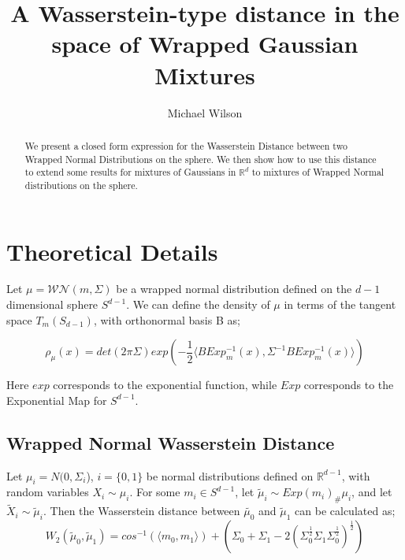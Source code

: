 \documentclass[]{article}
\title{A Wasserstein-type distance in the space of Wrapped Gaussian Mixtures}
\author{Michael Wilson}
\date{}
\begin{document}
	
	\maketitle
	
	\begin{abstract}
	We present a closed form expression for the Wasserstein Distance between two Wrapped Normal Distributions on the sphere. We then show how to use this distance to extend some results for mixtures of Gaussians in $\mathbb{R}^d$ to mixtures of Wrapped Normal distributions on the sphere.  
	\end{abstract}


\section{Theoretical Details}

Let $\mu = \mathcal{WN}(m,\Sigma)$ be a wrapped normal distribution defined on the $d-1$ dimensional sphere $S^{d-1}$. We can define the density of $\mu$ in terms of the tangent space $T_m(S_{d-1})$, with orthonormal basis B as; 

\begin{equation*}
	\rho_\mu(x) = det(2 \pi \Sigma) exp(-\frac{1}{2} \langle B Exp_m^{-1}(x), \Sigma^{-1} B Exp_m^{-1}(x) \rangle) 
\end{equation*}

Here $exp$ corresponds to the exponential function, while $Exp$ corresponds to the Exponential Map for $S^{d-1}$.

\subsection{Wrapped Normal Wasserstein Distance}

Let $\mu_i = N(0,\Sigma_i$), $i = \{0,1\}$ be normal distributions defined on $\mathbb{R}^{d-1}$, with random variables $X_i \sim \mu_i$. For some $m_i \in S^{d-1}$, let $\tilde{\mu}_i \sim Exp(m_i)_\#\mu_i$, and let $\tilde{X}_i \sim \tilde{\mu}_i$. Then the Wasserstein distance between $\tilde{\mu_0}$ and $\tilde{\mu}_1$ can be calculated as;\\

\begin{equation}
	W_2(\tilde{\mu}_0, \tilde{\mu}_1) =  cos^{-1}(\langle m_0,m_1\rangle) + (\Sigma_0 + \Sigma_1 - 2 (\Sigma_0^{\frac{1}{2}} \Sigma_1 \Sigma_0^{\frac{1}{2}})^{\frac{1}{2}}) 
\end{equation} 
\end{document}
